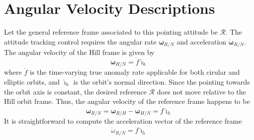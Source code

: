 \documentclass[]{AVSSimReportMemo}
\begin{document}
\section{Angular Velocity Descriptions}
Let the general reference frame associated to this pointing attitude be $\mathcal{R}$. The attitude tracking control requires the angular rate $\bm\omega_{R/N}$ and acceleration $\dot{\bm\omega}_{R/N}$. The angular velocity of the Hill frame is given by
\begin{equation}
	\label{eq:dbeta}
	\bm\omega_{H/N} = \dot f \hat{\bm\imath}_{h} 
\end{equation}
where $\dot f$ is the time-varying true anomaly rate applicable for both cirular and elliptic orbits, and $\hat{\bm\imath}_{h}$ is the orbit's normal direction. Since the pointing towards the orbit axis is constant, the desired reference $\mathcal{R}$ does not move relative to the Hill orbit frame. Thus, the angular velocity of the reference frame happens to be
\begin{equation}
	\label{eq:dbeta}
	\bm\omega_{R/N} = \bm\omega_{R/H} - \bm\omega_{H/N} = \dot{f} \hat{\bm\imath}_{h}
\end{equation}
It is straightforward to compute the acceleration vector of the reference frame
\begin{equation}
	\label{eq:dbeta}
	\dot\omega_{R/N} = \ddot{f} \hat{\bm\imath}_{h}
\end{equation}



\end{document}
